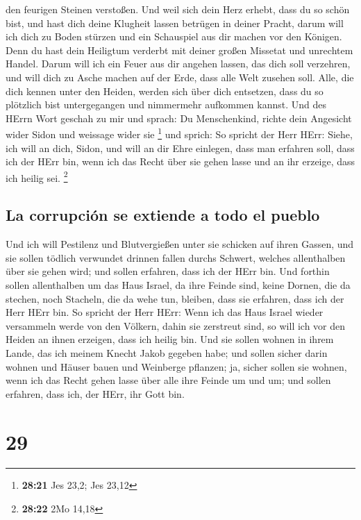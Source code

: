 den feurigen Steinen verstoßen.  Und weil sich dein Herz
erhebt, dass du so schön bist, und hast dich deine Klugheit lassen
betrügen in deiner Pracht, darum will ich dich zu Boden stürzen und ein
Schauspiel aus dir machen vor den Königen.  Denn du hast
dein Heiligtum verderbt mit deiner großen Missetat und unrechtem Handel.
Darum will ich ein Feuer aus dir angehen lassen, das dich soll
verzehren, und will dich zu Asche machen auf der Erde, dass alle Welt
zusehen soll.  Alle, die dich kennen unter den Heiden,
werden sich über dich entsetzen, dass du so plötzlich bist untergegangen
und nimmermehr aufkommen kannst.  Und des HErrn Wort
geschah zu mir und sprach:  Du Menschenkind, richte dein
Angesicht wider Sidon und weissage wider sie \footnote{\textbf{28:21}
  Jes 23,2; Jes 23,12}  und sprich: So spricht der Herr
HErr: Siehe, ich will an dich, Sidon, und will an dir Ehre einlegen,
dass man erfahren soll, dass ich der HErr bin, wenn ich das Recht über
sie gehen lasse und an ihr erzeige, dass ich heilig sei. \footnote{\textbf{28:22}
  2Mo 14,18}

\hypertarget{la-corrupciuxf3n-se-extiende-a-todo-el-pueblo}{%
\subsection{La corrupción se extiende a todo el
pueblo}\label{la-corrupciuxf3n-se-extiende-a-todo-el-pueblo}}

 Und ich will Pestilenz und Blutvergießen unter sie
schicken auf ihren Gassen, und sie sollen tödlich verwundet drinnen
fallen durchs Schwert, welches allenthalben über sie gehen wird; und
sollen erfahren, dass ich der HErr bin.  Und forthin
sollen allenthalben um das Haus Israel, da ihre Feinde sind, keine
Dornen, die da stechen, noch Stacheln, die da wehe tun, bleiben, dass
sie erfahren, dass ich der Herr HErr bin.  So spricht der
Herr HErr: Wenn ich das Haus Israel wieder versammeln werde von den
Völkern, dahin sie zerstreut sind, so will ich vor den Heiden an ihnen
erzeigen, dass ich heilig bin. Und sie sollen wohnen in ihrem Lande, das
ich meinem Knecht Jakob gegeben habe;  und sollen sicher
darin wohnen und Häuser bauen und Weinberge pflanzen; ja, sicher sollen
sie wohnen, wenn ich das Recht gehen lasse über alle ihre Feinde um und
um; und sollen erfahren, dass ich, der HErr, ihr Gott bin.

\hypertarget{section-28}{%
\section{29}\label{section-28}}

